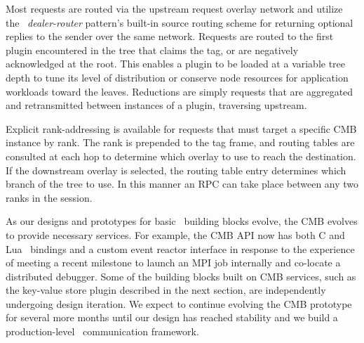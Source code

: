 Most requests are routed via the upstream request overlay network
and utilize the \zMQ\ {\em dealer-router} pattern's built-in source routing
scheme for returning optional replies to the sender over the same network.
Requests are routed to the first plugin encountered in the tree that claims
the tag, or are negatively acknowledged at the root.  This enables a plugin
to be loaded at a variable tree depth to tune its level of distribution
or conserve node resources for application workloads toward the leaves.
Reductions are simply requests that are aggregated and retransmitted between
instances of a plugin, traversing upstream.

Explicit rank-addressing is available for requests that must target a
specific CMB instance by rank.  The rank is prepended to the tag frame,
and routing tables are consulted at each hop to determine which overlay
to use to reach the destination.  If the downstream overlay is selected,
the routing table entry determines which branch of the tree to use.
In this manner an RPC can take place between any two ranks in the session.

As our designs and prototypes for basic \flux\ building blocks evolve,
the CMB evolves to provide necessary services.  For example, the CMB API
now has both C and Lua~\cite{LuaBook}  bindings and a custom event reactor interface in
response to the experience of meeting a recent milestone to launch an
MPI job internally and co-locate a distributed debugger.  Some of the building
blocks built on CMB services, such as the key-value store plugin described
in the next section, are independently undergoing design iteration.
We expect to continue evolving the CMB prototype for several more months until
our design has reached stability and we build a production-level \flux\ 
communication framework.
